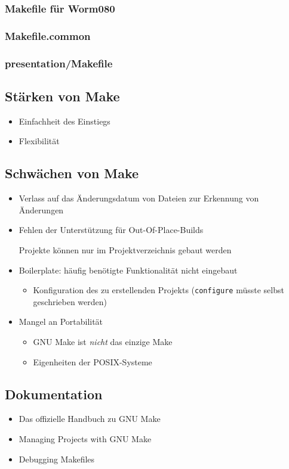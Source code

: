 \begin{frame}[allowframebreaks]
	\frametitle{Makefile für Worm080}
\end{frame}

\begin{frame}[allowframebreaks]
	\frametitle{Makefile.common}
\end{frame}

\begin{frame}
	\frametitle{presentation/Makefile}
\end{frame}

\subsection{Stärken von Make}
\begin{frame}
	\begin{itemize}
		\item Einfachheit des Einstiegs
		\item Flexibilität
	\end{itemize}
\end{frame}

\subsection{Schwächen von Make}
\begin{frame}
	\begin{itemize}
		\item Verlass auf das Änderungsdatum von Dateien zur Erkennung von Änderungen
		\item Fehlen der Unterstützung für Out-Of-Place-Builds

			Projekte können nur im Projektverzeichnis gebaut werden
		\item Boilerplate: häufig benötigte Funktionalität nicht eingebaut
			\begin{itemize}
				\item Konfiguration des zu erstellenden Projekts (\texttt{configure} müsste selbst geschrieben werden)
			\end{itemize}
		\item Mangel an Portabilität
			\begin{itemize}
				\item GNU Make ist \emph{nicht} das einzige Make
				\item Eigenheiten der POSIX-Systeme
			\end{itemize}
	\end{itemize}
\end{frame}

\subsection{Dokumentation}
\begin{frame}
	\begin{itemize}
	\item Das offizielle Handbuch zu GNU Make \cite{GNU_Make_manual}
	\item Managing Projects with GNU Make \cite{OreillyMake}
	\item Debugging Makefiles \cite{DobbsDebuggingMakefiles}
	\end{itemize}
\end{frame}
